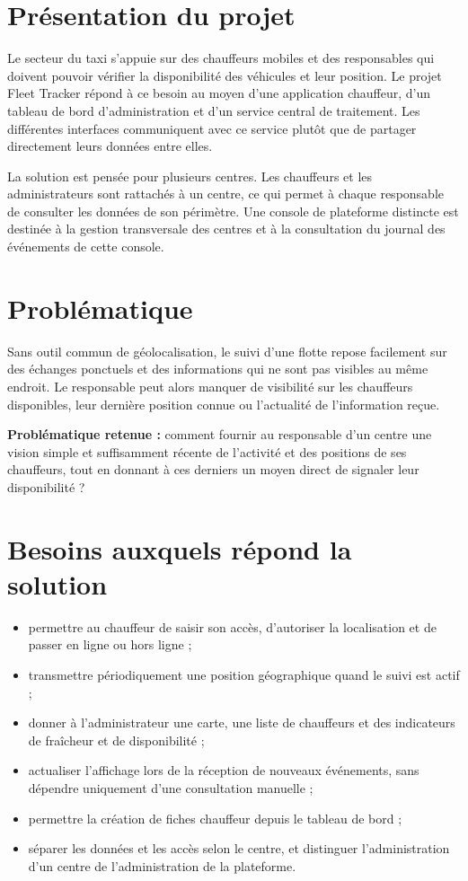 \documentclass[11pt,a4paper,oneside]{report}
\begin{document}
\section{Présentation du projet}

Le secteur du taxi s'appuie sur des chauffeurs mobiles et des responsables qui
doivent pouvoir vérifier la disponibilité des véhicules et leur position. Le
projet Fleet Tracker répond à ce besoin au moyen d'une application chauffeur,
d'un tableau de bord d'administration et d'un service central de traitement.
Les différentes interfaces communiquent avec ce service plutôt que de partager
directement leurs données entre elles.

La solution est pensée pour plusieurs centres. Les chauffeurs et les
administrateurs sont rattachés à un centre, ce qui permet à chaque responsable
de consulter les données de son périmètre. Une console de plateforme distincte
est destinée à la gestion transversale des centres et à la consultation du
journal des événements de cette console.

\section{Problématique}

Sans outil commun de géolocalisation, le suivi d'une flotte repose facilement
sur des échanges ponctuels et des informations qui ne sont pas visibles au
même endroit. Le responsable peut alors manquer de visibilité sur les
chauffeurs disponibles, leur dernière position connue ou l'actualité de
l'information reçue.

\medskip
\noindent\textbf{Problématique retenue :} comment fournir au responsable d'un
centre une vision simple et suffisamment récente de l'activité et des positions
de ses chauffeurs, tout en donnant à ces derniers un moyen direct de signaler
leur disponibilité ?

\section{Besoins auxquels répond la solution}

\begin{itemize}
  \item permettre au chauffeur de saisir son accès, d'autoriser la localisation
        et de passer en ligne ou hors ligne ;
  \item transmettre périodiquement une position géographique quand le suivi est
        actif ;
  \item donner à l'administrateur une carte, une liste de chauffeurs et des
        indicateurs de fraîcheur et de disponibilité ;
  \item actualiser l'affichage lors de la réception de nouveaux événements,
        sans dépendre uniquement d'une consultation manuelle ;
  \item permettre la création de fiches chauffeur depuis le tableau de bord ;
  \item séparer les données et les accès selon le centre, et distinguer
        l'administration d'un centre de l'administration de la plateforme.
\end{itemize}
\end{document}
